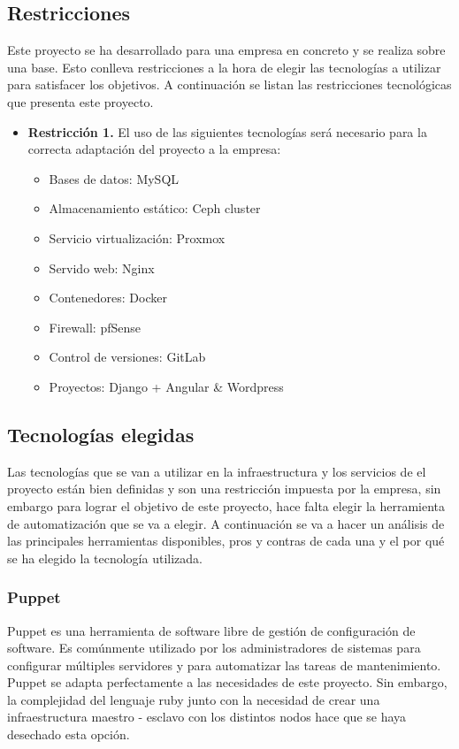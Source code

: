 	\subsection{Restricciones}
	\begin{text}
		Este proyecto se ha desarrollado para una empresa en concreto y se realiza sobre una base. Esto conlleva restricciones a la hora de elegir las tecnologías a utilizar para satisfacer los objetivos. A continuación se listan las restricciones tecnológicas que presenta este proyecto.
		
		\begin{itemize}
			\item \textbf{Restricción 1.} El uso de las siguientes tecnologías será necesario para la correcta adaptación del proyecto a la empresa:
			\begin{itemize}
				\item Bases de datos: MySQL
				\item Almacenamiento estático: Ceph cluster
				\item Servicio virtualización: Proxmox
				\item Servido web: Nginx
				\item Contenedores: Docker
				\item Firewall: pfSense
				\item Control de versiones: GitLab
				\item Proyectos: Django + Angular \& Wordpress
			\end{itemize}
		\end{itemize}
	\end{text}

	\subsection{Tecnologías elegidas}
	\begin{text}
		Las tecnologías que se van a utilizar en la infraestructura y los servicios de el proyecto están bien definidas y son una restricción impuesta por la empresa, sin embargo para lograr el objetivo de este proyecto, hace falta elegir la herramienta de automatización que se va a elegir. A continuación se va a hacer un análisis de las principales herramientas disponibles, pros y contras de cada una y el por qué se ha elegido la tecnología utilizada.
	\end{text}
	\subsubsection{Puppet}
	\begin{text}
		Puppet es una herramienta de software libre de gestión de configuración de software. Es comúnmente utilizado por los administradores de sistemas para configurar múltiples servidores y para automatizar las tareas de mantenimiento. Puppet se adapta perfectamente a las necesidades de este proyecto. Sin embargo, la complejidad del lenguaje ruby junto con la necesidad de crear una infraestructura maestro - esclavo con los distintos nodos hace que se haya desechado esta opción.
	\end{text}
\clearpage
